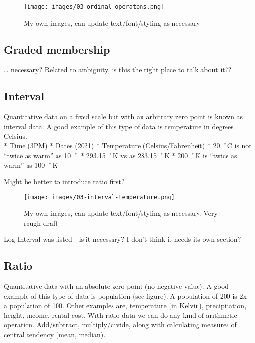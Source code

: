 \documentclass[
]{book}
\begin{document}
\begin{figure}
\centering
\texttt{[image: images/03-ordinal-operatons.png]}
\caption{My own images, can update text/font/styling as necessary}
\end{figure}

\hypertarget{graded-membership}{%
\subsection{Graded membership}\label{graded-membership}}

\ldots{} necessary? Related to ambiguity, is this the right place to talk about it??

\hypertarget{interval}{%
\subsection{Interval}\label{interval}}

Quantitative data on a fixed scale but with an arbitrary zero point is known as interval data. A good example of this type of data is temperature in degrees Celsius.\\
* Time (3PM)
* Dates (2021)
* Temperature (Celsius/Fahrenheit)
* 20 ˚C is not ``twice as warm'' as 10 ˚
* 293.15 ˚K vs as 283.15 ˚K
* 200 ˚K is ``twice as warm'' as 100 ˚K

Might be better to introduce ratio first?

\begin{figure}
\centering
\texttt{[image: images/03-interval-temperature.png]}
\caption{My own images, can update text/font/styling as necessary. Very rough draft}
\end{figure}

Log-Interval was listed - is it necessary? I don't think it needs its own section?

\hypertarget{ratio}{%
\subsection{Ratio}\label{ratio}}

Quantitative data with an absolute zero point (no negative value). A good example of this type of data is population (see figure). A population of 200 is 2x a population of 100. Other examples are, temperature (in Kelvin), precipitation, height, income, rental cost. With ratio data we can do any kind of arithmetic operation. Add/subtract, multiply/divide, along with calculating measures of central tendency (mean, median).
\end{document}
